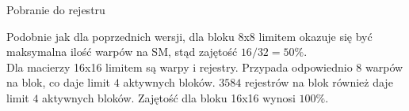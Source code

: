 \begin{enumerate}[(a)]

\begin{minipage}[c]{\textwidth}

\item Pobranie do rejestru

\begin{center}
\begin{table}[H]
\centering
{}
\caption{Teoretyczna zajętość SM -- wersja 4. z pobraniem do rejestru.}
\end{table}
\end{center}

Podobnie jak dla poprzednich wersji, dla bloku 8x8 limitem okazuje się być maksymalna ilość warpów na SM, stąd zajętość $ 16 / 32 = 50\% $. \\
Dla macierzy 16x16 limitem są warpy i rejestry. Przypada odpowiednio $ 8 $ warpów na blok, co daje limit $ 4 $ aktywnych bloków. $ 3584 $ rejestrów na blok również daje limit $ 4 $ aktywnych bloków. Zajętość dla bloku 16x16 wynosi $ 100\% $. \\


\end{minipage}
\end{enumerate}
